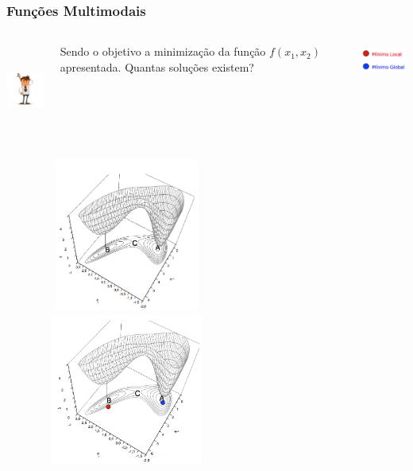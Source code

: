\documentclass{beamer}
\begin{document}
\begin{frame}
	\frametitle{Funções Multimodais}
	\centering
	\begin{columns}
		\begin{column}{0.15\textwidth}
			\includegraphics[width=2cm,height=3cm]{duvida.jpg}
		\end{column}
		\begin{column}{0.6\textwidth}
			Sendo o objetivo a minimização da função $f(x_1,x_2)$ apresentada. Quantas soluções existem?
		\end{column}
		{
			\begin{column}{0.35\textwidth}
				\includegraphics[width=2.5cm,height=1cm]{multimodal4.png}	
			\end{column}
		}		
	\end{columns}
	{
		\includegraphics[width=8cm,height=5cm]{multimodal2.png}	
	}
	\only<2->
	{
		\includegraphics[width=8cm,height=5cm]{multimodal3.png}	
	}	
\end{frame}
\end{document}
